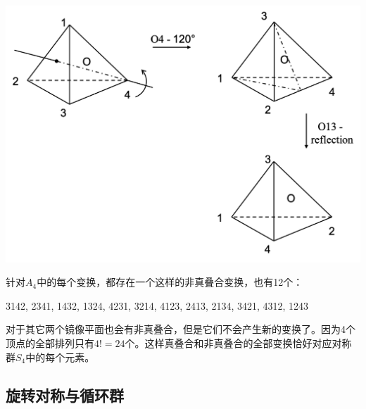 \documentclass[b5paper]{ctexart}
\begin{document}
\begin{Answer}[ref={ex:symmetry-and-group}]
\begin{center}
 \includegraphics[scale=0.4]{../appendix/answer/img/S4}
 \label{fig:S4}
\end{center}

针对$A_4$中的每个变换，都存在一个这样的非真叠合变换，也有12个：

3142, 2341, 1432, 1324, 4231, 3214, 4123, 2413, 2134, 3421, 4312, 1243

对于其它两个镜像平面也会有非真叠合，但是它们不会产生新的变换了。因为4个顶点的全部排列只有$4! = 24$个。这样真叠合和非真叠合的全部变换恰好对应对称群$S_4$中的每个元素。
\end{Answer}

\subsection{旋转对称与循环群}
\end{document}
